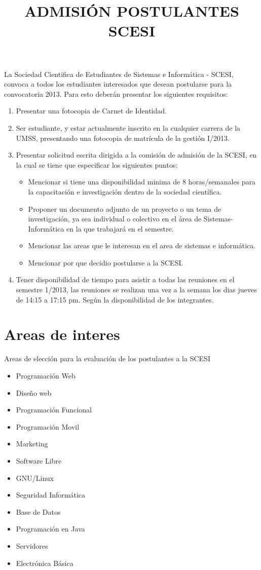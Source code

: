 \documentclass[letter,12pt]{article}
\title{\bf ADMISIÓN POSTULANTES SCESI}
\date{}
\begin{document}
\maketitle
La Sociedad Cientifica de Estudiantes de Sistemas e Informática - SCESI, convoca a todos los estudiantes interesados que desean postularse para la convocatoria 2013.
Para esto deberán presentar los siguientes requisitos:

\begin{enumerate}
\item Presentar una fotocopia de Carnet de Identidad.
\item Ser estudiante, y estar actualmente inscrito en la cualquier carrera de la UMSS, presentando una fotocopia de matrícula de la gestión I/2013.
\item Presentar solicitud escrita dirigida a la comisión de admisión de la SCESI, en la cual se tiene que especificar los siguientes puntos:
\begin{itemize}
\item Mencionar si tiene una disponibilidad minima de 8 horas/semanales para la capacitación e investigación dentro de la sociedad científica.
\item Proponer un documento adjunto de un proyecto o un tema de investigación, ya sea individual o colectivo en el área de Sistemas-Informática en la que trabajará en el semestre.
\item Mencionar las areas que le interesan en el area de sistemas e informática.
\item Mencionar por que decidio postularse a la SCESI.
\end{itemize}

\item Tener disponibilidad de tiempo para asistir a todas las reuniones en el semestre 1/2013, las reuniones se realizan una vez a la semana los dias jueves de 14:15 a 17:15 pm. Según la disponibilidad de los integrantes.
\end{enumerate}
\newpage
\section*{Areas de interes}
Areas de elección para la evaluación de los postulantes a la SCESI
\begin{itemize}
\item Programación Web
\item Diseño web
\item Programación Funcional
\item Programación Movil
\item Marketing
\item Software Libre
\item GNU/Linux
\item Seguridad Informática
\item Base de Datos
\item Programación en Java
\item Servidores
\item Electrónica Básica
\end{itemize}
\end{document}
